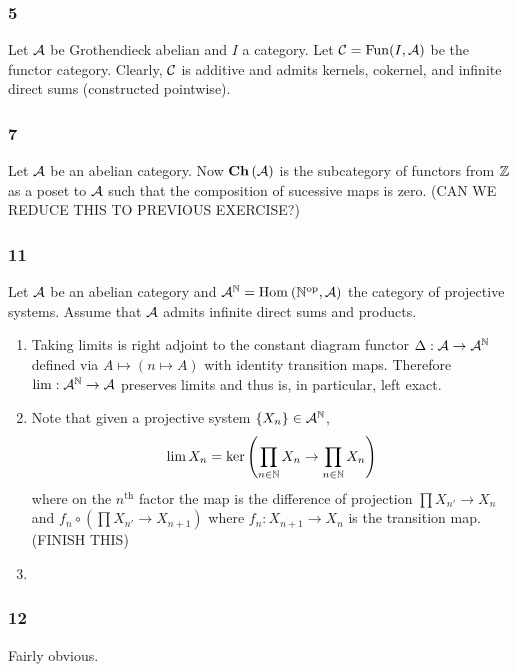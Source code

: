 \documentclass[12pt]{article}
\begin{document}
\subsubsection*{5}

Let $\mathcal{A}$ be Grothendieck abelian and $I$ a category.  Let $\mathcal{C} = \mathrm{Fun}(I, \mathcal{A})$ be the functor category. Clearly, $\mathcal{C}$ is additive and admits kernels, cokernel, and infinite direct sums (constructed pointwise). 

\subsubsection*{7}

Let $\mathcal{A}$ be an abelian category. Now $\mathbf{Ch}\left( \mathcal{A} \right)$ is the subcategory of functors from $\mathbb{Z}$ as a poset to $\mathcal{A}$ such that the composition of sucessive maps is zero. (CAN WE REDUCE THIS TO PREVIOUS EXERCISE?)

\subsubsection*{11}

Let $\mathcal{A}$ be an abelian category and $\mathcal{A}^{\mathbb{N}} = \mathrm{Hom}_{} \left( \mathbb{N}^{\mathrm{op}}, \mathcal{A} \right)$ the category of projective systems. Assume that $\mathcal{A}$ admits infinite direct sums and products.

\begin{enumerate}
\item 
Taking limits is right adjoint to the constant diagram functor $\Delta : \mathcal{A} \to \mathcal{A}^{\mathbb{N}}$ defined via $A \mapsto (n \mapsto A)$ with identity transition maps. Therefore $\lim : \mathcal{A}^{\mathbb{N}} \to \mathcal{A}$ preserves limits and thus is, in particular, left exact.

\item Note that given a projective system $\{ X_n \} \in \mathcal{A}^{\mathbb{N}}$,
\[ \lim X_n = \ker{\left( \prod_{n \in \mathbb{N}} X_n \to \prod_{n \in \mathbb{N}} X_n \right)} \]
where on the $n^{\mathrm{th}}$ factor the map is the difference of projection $\prod X_{n'} \to X_n$ and $f_n \circ (\prod X_{n'} \to X_{n+1})$ where $f_n : X_{n+1} \to X_n$ is the transition map. (FINISH THIS)

\item 
\end{enumerate}

\subsubsection*{12}

Fairly obvious.
\end{document}
